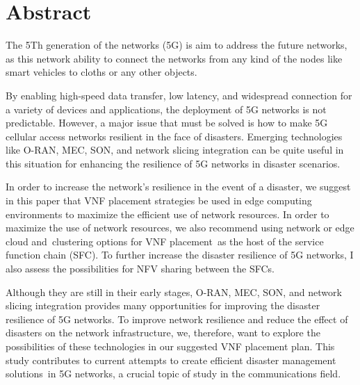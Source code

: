 \thispagestyle{plain}

\section*{Abstract}
The 5Th generation of the networks (5G) is aim to address the future networks, as this network ability to connect the networks from any kind of the nodes like smart vehicles to cloths or any other objects. 

By enabling high-speed data transfer, low latency, and widespread connection for a variety of devices and  applications, the deployment of 5G networks is not predictable. However, a major issue that must be solved is how to make 5G cellular access networks resilient in the face of disasters. Emerging technologies like O-RAN, MEC, SON, and network slicing integration can be quite useful in this situation for enhancing the resilience of 5G networks in disaster scenarios.

In order to increase the network's resilience in the event of a disaster, we suggest in this paper that VNF placement strategies be used in edge computing environments to maximize the efficient use of network resources. In order to maximize the use of network resources, we also recommend using network or edge cloud and clustering options for VNF placement as the host of the service function chain (SFC). To further increase the disaster resilience of 5G networks, I also assess the possibilities for NFV sharing between the SFCs.

Although they are still in their early stages, O-RAN, MEC, SON, and network slicing integration provides many opportunities for improving the disaster resilience of 5G networks. To improve network resilience and reduce the effect of disasters on the network infrastructure, we, therefore, want to explore the possibilities of these technologies in our suggested VNF placement plan. This study contributes to current attempts to create efficient disaster management solutions in 5G networks, a crucial topic of study in the communications field.







